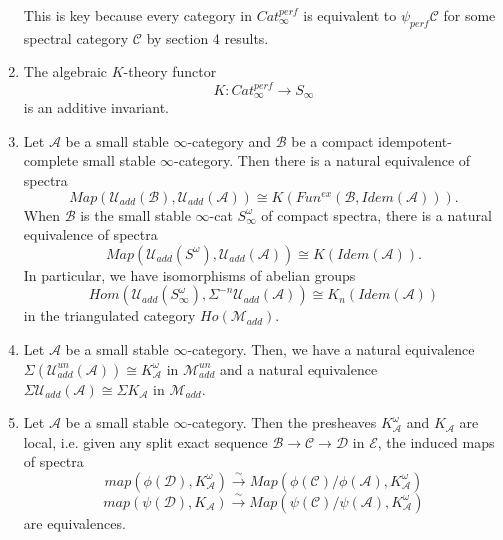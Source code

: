 \documentclass[letterpaper]{article}
\theoremstyle{definition}
\newcommand{\mc}{\mathcal}
\begin{document}
\begin{enumerate}
This is key because every category in $Cat_{\infty}^{perf}$ is
equivalent to $\psi_{perf}\mc C$ for some spectral category $\mc C$ by
section 4 results.
\item The algebraic $K$-theory functor
\[
K : Cat_{\infty}^{perf} \rightarrow S_{\infty}
\]
is an additive invariant.
\item Let $\mc A$ be a small stable $\infty$-category and $\mc B$ be a
  compact idempotent-complete small stable $\infty$-category. Then
  there is a natural equivalence of spectra
\[
Map(\mc U_{add}(\mc B),\mc U_{add}(\mc A)) \cong K(Fun^{ex}(\mc
B,Idem(\mc A))).
\]
When $\mc B$ is the small stable $\infty$-cat $S^\omega_{\infty}$ of
compact spectra, there is a natural equivalence of spectra
\[
Map(\mc U_{add}(S^\omega),\mc U_{add}(\mc A)) \cong K(Idem(\mc A)).
\]
In particular, we have isomorphisms of abelian groups
\[
Hom(\mc U_{add}(S^\omega_{\infty}),\Sigma^{-n}\mc U_{add}(\mc A))
\cong K_n(Idem(\mc A))
\]
in the triangulated category $Ho(\mc M_{add})$.
\item Let $\mc A$ be a small stable $\infty$-category. Then, we have a
  natural equivalence $\Sigma (\mc U^{un}_{add}(\mc A)) \cong K_{\mc
    A}^{\omega}$ in $\mc M_{add}^{un}$ and a natural equivalence $\Sigma
  \mc U_{add}(\mc A) \cong \Sigma K_{\mc A}$ in $\mc M_{add}$.
\item Let $\mc A$ be a small stable $\infty$-category. Then the
  presheaves $K_{\mc A}^{\omega}$ and $K_{\mc A}$ are local,
  i.e. given any split exact sequence $\mc B \rightarrow \mc C
  \rightarrow \mc D$ in $\mc E$, the induced maps of spectra
\[
map(\phi(\mc D),K_{\mc A}^\omega) \xrightarrow{\sim} Map(\phi(\mc
C)/\phi(\mc A), K_{\mc A}^\omega)
\]
\[
map(\psi(\mc D),K_{\mc A}) \xrightarrow{\sim} Map(\psi(\mc
C)/\psi(\mc A), K_{\mc A}^\omega)
\]
are equivalences. 
\end{enumerate}
\end{document}
